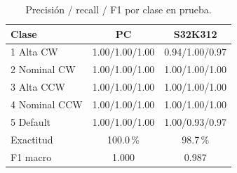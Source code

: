 \begin{table}[t]
\centering
\caption{Precisión / recall / F1 por clase en prueba.}
\label{tab:metricas}
\scriptsize
\setlength{\tabcolsep}{3pt}
\begin{tabular}{lcc}
\toprule
Clase & PC & S32K312 \\
\midrule
1 Alta CW & 1.00/1.00/1.00 & 0.94/1.00/0.97 \\
2 Nominal CW & 1.00/1.00/1.00 & 1.00/1.00/1.00 \\
3 Alta CCW & 1.00/1.00/1.00 & 1.00/1.00/1.00 \\
4 Nominal CCW & 1.00/1.00/1.00 & 1.00/1.00/1.00 \\
5 Default & 1.00/1.00/1.00 & 1.00/0.93/0.97 \\
\midrule
Exactitud & 100.0\,\% & 98.7\,\% \\
F1 macro & 1.000 & 0.987 \\
\bottomrule
\end{tabular}
\end{table}
